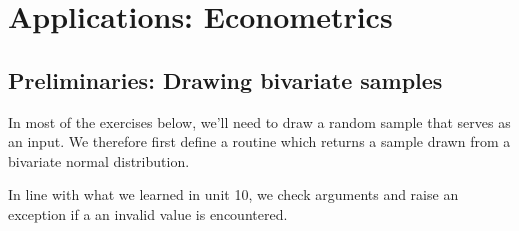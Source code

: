 \documentclass[10pt]{scrartcl}
\begin{document}
    
    \maketitle
    \tableofcontents

    

    
    \hypertarget{applications-econometrics}{%
\section{Applications: Econometrics}\label{applications-econometrics}}

    \hypertarget{preliminaries-drawing-bivariate-samples}{%
\subsection{Preliminaries: Drawing bivariate
samples}\label{preliminaries-drawing-bivariate-samples}}

In most of the exercises below, we'll need to draw a random sample that
serves as an input. We therefore first define a routine which returns a
sample drawn from a bivariate normal distribution.

In line with what we learned in unit 10, we check arguments and raise an
exception if a an invalid value is encountered.
\end{document}
